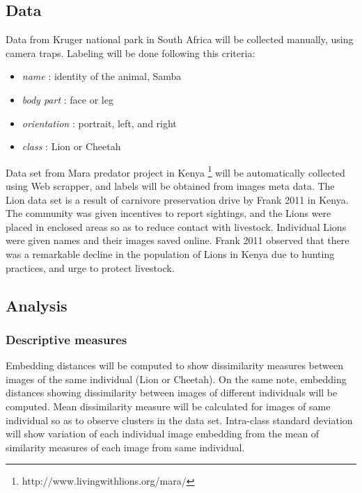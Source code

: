 \subsection{Data}
Data from Kruger national park in South Africa will be collected manually, using camera traps.
Labeling will be done following this criteria: 
\begin{itemize}
    \item \textit{name} : identity of the animal, Samba
    \item \textit{body part} : face or leg
    \item \textit{orientation} : portrait, left, and right
    \item \textit{class} : Lion or Cheetah
\end{itemize}
Data set from Mara predator project in Kenya \footnote{http://www.livingwithlions.org/mara/}  will be automatically collected using Web scrapper, and labels will be obtained from images meta data. The Lion data set is a result of carnivore preservation drive by Frank 2011 \cite{frank2011living} in Kenya. The community was given incentives to report sightings, and the Lions were placed in enclosed areas so as to reduce contact with livestock. Individual Lions were given names and their images saved online. Frank 2011 observed that there was a remarkable decline in the population of Lions in Kenya due to hunting practices, and urge to protect livestock.  
\subsection{Analysis}
\subsubsection{Descriptive measures }
Embedding distances will be computed to show dissimilarity measures between images of the same individual (Lion or Cheetah). On the same note, embedding distances showing dissimilarity between images of different individuals will be computed. Mean dissimilarity measure will be calculated for images of same individual so as to observe clusters in the data set. Intra-class standard deviation will show variation of each individual image embedding from the mean of similarity measures of each image from same individual.  

